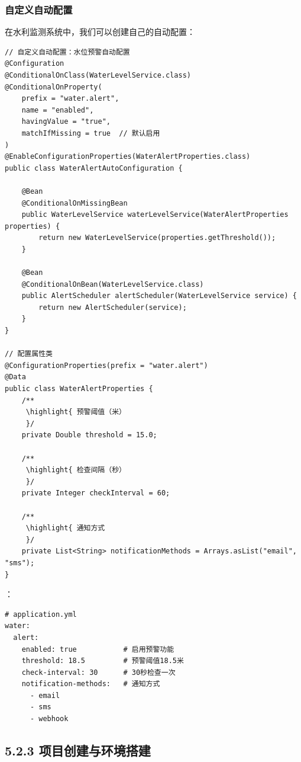 \hypertarget{ux81eaux5b9aux4e49ux81eaux52a8ux914dux7f6e}{%
\subsubsection{自定义自动配置}\label{ux81eaux5b9aux4e49ux81eaux52a8ux914dux7f6e}}

在水利监测系统中，我们可以创建自己的自动配置：

\begin{lstlisting}[style=java]
// 自定义自动配置：水位预警自动配置
@Configuration
@ConditionalOnClass(WaterLevelService.class)
@ConditionalOnProperty(
    prefix = "water.alert", 
    name = "enabled", 
    havingValue = "true",
    matchIfMissing = true  // 默认启用
)
@EnableConfigurationProperties(WaterAlertProperties.class)
public class WaterAlertAutoConfiguration {
    
    @Bean
    @ConditionalOnMissingBean
    public WaterLevelService waterLevelService(WaterAlertProperties properties) {
        return new WaterLevelService(properties.getThreshold());
    }
    
    @Bean
    @ConditionalOnBean(WaterLevelService.class)
    public AlertScheduler alertScheduler(WaterLevelService service) {
        return new AlertScheduler(service);
    }
}

// 配置属性类
@ConfigurationProperties(prefix = "water.alert")
@Data
public class WaterAlertProperties {
    /**
     \highlight{ 预警阈值（米）
     }/
    private Double threshold = 15.0;
    
    /**
     \highlight{ 检查间隔（秒）
     }/
    private Integer checkInterval = 60;
    
    /**
     \highlight{ 通知方式
     }/
    private List<String> notificationMethods = Arrays.asList("email", "sms");
}
\end{lstlisting}

：

\begin{lstlisting}
# application.yml
water:
  alert:
    enabled: true           # 启用预警功能
    threshold: 18.5         # 预警阈值18.5米
    check-interval: 30      # 30秒检查一次
    notification-methods:   # 通知方式
      - email
      - sms
      - webhook
\end{lstlisting}

\hypertarget{ux9879ux76eeux521bux5efaux4e0eux73afux5883ux642dux5efa}{%
\subsection{5.2.3 项目创建与环境搭建}\label{ux9879ux76eeux521bux5efaux4e0eux73afux5883ux642dux5efa}}

